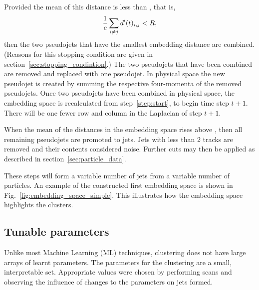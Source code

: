 \begin{enumerate}
            Provided the mean of this distance is less than \stoppingdeltar{}, that is,
            \begin{equation}
                \frac{1}{c}\sum_{i\ne j} d'(t)_{i, j} < R{},
            \end{equation}
            then the two pseudojets that have the smallest embedding distance are combined.
            (Reasons for this stopping condition are given in section~\ref{sec:stopping_condintion}.)
        The two pseudojets that have been combined are removed and replaced with one pseudojet.
        In physical space the new pseudojet is created by summing the respective four-momenta of the removed pseudojets.
        Once two pseudojets have been combined in physical space, the embedding space is recalculated from step~\ref{step:start}, 
        to begin time step \(t+1\).
        There will be one fewer row and column in the Laplacian of step \(t+1\).
     \end{enumerate}
    When the mean of the distances in the embedding space rises above \stoppingdeltar{},
    then all remaining pseudojets are promoted to jets.
    Jets with less than 2 tracks are removed and their contents considered noise.
    Further cuts may then be applied as described in section~\ref{sec:particle_data}.

    These steps will form a variable number of jets from a variable number of particles.
    An example of the constructed first embedding space is shown in Fig.~\ref{fig:embedding_space_simple}.
    This illustrates how the embedding space highlights the clusters.

\subsection{Tunable parameters}\label{sec:spectralmethodparam}
Unlike most Machine Learning (ML) techniques, \spectral{} clustering does not have large arrays of learnt parameters.
The parameters for the clustering are a small, interpretable  set.
Appropriate values were chosen by performing scans and observing the influence of changes to the parameters on jets formed.

